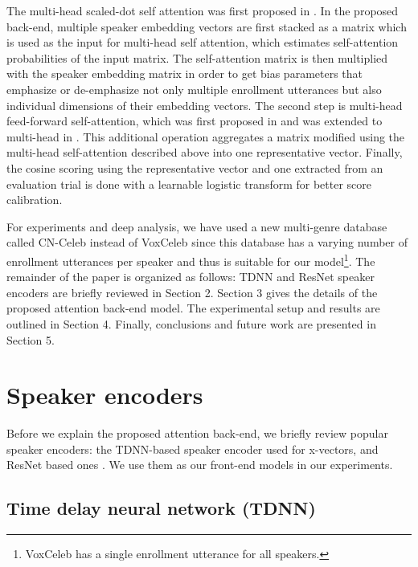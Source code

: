 \documentclass[a4paper]{article}
\begin{document}
The multi-head scaled-dot self attention was first proposed in \cite{Vaswani2017-Attention}. In the proposed back-end, multiple speaker embedding vectors are first stacked as a matrix which is used as the input for multi-head self attention, which estimates self-attention probabilities of the input matrix. The self-attention matrix is then multiplied with the speaker embedding matrix in order to get bias parameters that emphasize or de-emphasize not only multiple enrollment utterances but also individual dimensions of their embedding vectors. The second step is multi-head feed-forward self-attention, which was first proposed in \cite{Raffel2015-FFNATT} and was extended to multi-head in \cite{Lin2017-StructureATT}. This additional operation aggregates a matrix modified using the multi-head self-attention described above into one representative vector. Finally, the cosine scoring using the representative vector and one extracted from an evaluation trial is done with a learnable logistic transform for better score calibration. 

For experiments and deep analysis, we have used a new multi-genre database called CN-Celeb \cite{Fan2020-CN1, Li2020-CN2} instead of VoxCeleb \cite{Nagrani2017-VOX1,Chung2018-VOX2} since this database has a varying number of enrollment utterances per speaker and thus is suitable for our model\footnote{VoxCeleb has a single enrollment utterance for all speakers.}. The remainder of the paper is organized as follows: TDNN and ResNet speaker encoders are briefly reviewed in Section 2. Section 3 gives the details of the proposed attention back-end model. The experimental setup and results are outlined in Section 4. Finally, conclusions and future work are presented in Section 5.

\section{Speaker encoders}

Before we explain the proposed attention back-end, we briefly review popular speaker encoders: the TDNN-based speaker encoder used for x-vectors, and ResNet based ones \cite{Li2017-DS, Zeinali2019-BUT, Garcia2020-MagNetO}. We use them as our front-end models in our experiments. 



\vspace{-1mm}
\subsection{Time delay neural network (TDNN)}
\end{document}
